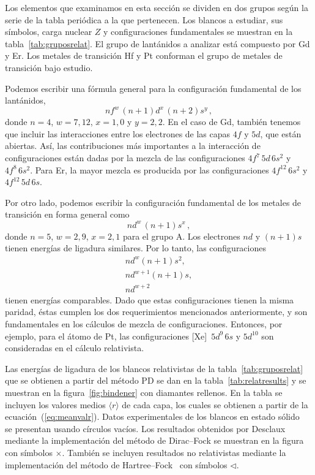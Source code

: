 Los elementos que examinamos en esta sección se dividen en dos grupos 
según la serie de la tabla periódica a la que pertenecen. Los blancos a 
estudiar, sus símbolos, carga nuclear $Z$ y configuraciones fundamentales 
se muestran en la tabla~\ref{tab:gruposrelat}. El grupo de lantánidos a
analizar está compuesto por Gd y Er. Los metales de transición Hf y Pt 
conforman el grupo de metales de transición bajo estudio. 

Podemos escribir una fórmula general para la configuración fundamental 
de los lantánidos,
\begin{equation}
nf^w\,(n+1)d^x\,(n+2)s^y\,,
\end{equation}
donde $n=4$, $w=7,12$, $x=1,0$ y $y=2,2$. En el caso de Gd, también 
tenemos que incluir las interacciones entre los electrones de las capas
$4f$ y $5d$, que están abiertas. Así, las contribuciones más 
importantes a la interacción de configuraciones están dadas por la 
mezcla de las configuraciones $4f^7\,5d\,6s^2$ y $4f^8\,6s^2$.
Para Er, la mayor mezcla es producida por las configuraciones 
$4f^{12}\,6s^2$ y $4f^{12}\,5d\,6s$.

Por otro lado, podemos escribir la configuración fundamental de los 
metales de transición en forma general como
\begin{equation}
nd^w\,(n+1)s^x\,,
\end{equation}
donde $n=5$, $w=2,9$, $x=2,1$ para el grupo A. Los electrones $nd$ y 
$(n+1)s$ tienen energías de ligadura similares. Por lo tanto, las 
configuraciones 
\begin{gather}
nd^w(n+1)s^2, \\
nd^{w+1}(n+1)s, \\
nd^{w+2}
\end{gather}
tienen energías comparables. Dado que estas configuraciones tienen la 
misma paridad, éstas cumplen los dos requerimientos mencionados 
anteriormente, y son fundamentales en los cálculos de mezcla de 
configuraciones. Entonces, por ejemplo, para el átomo de Pt, las 
configuraciones [Xe]~$5d^9\,6s$ y $5d^{10}$ son consideradas en el 
cálculo relativista.

Las energías de ligadura de los blancos relativistas de la 
tabla~\ref{tab:gruposrelat} que se obtienen a partir del método PD se 
dan en la tabla~\ref{tab:relatresults} y se muestran en la 
figura~\ref{fig:bindener} con diamantes rellenos. En la tabla se 
incluyen los valores medios $\langle r\rangle$ de cada capa, los cuales 
se obtienen a partir de la ecuación~(\ref{eq:meanvalr}). Datos 
experimentales de los blancos en estado sólido~\cite{Williams:95} se 
presentan usando círculos vacíos. Los resultados obtenidos por 
Desclaux~\cite{Desclaux:73} mediante la implementación del método 
de Dirac--Fock se muestran en la figura con símbolos $\times$. También 
se incluyen resultados no relativistas mediante la implementación del 
método de Hartree--Fock~\cite{FroeseFischer:97} con símbolos 
$\triangleleft$.

